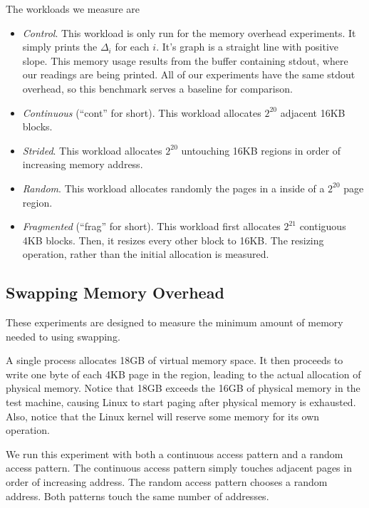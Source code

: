 \documentclass[twocolumn,11pt]{article}
\begin{document}
The workloads we measure are

\begin{itemize} \item \textit{Control}. This workload is only run for the memory
overhead experiments. It simply prints the $\Delta_i$ for each $i$. It's graph
is a straight line with positive slope. This memory usage results from the
buffer containing stdout, where our readings are being printed. All of our
experiments have the same stdout overhead, so this benchmark serves a baseline
for comparison.

\item \textit{Continuous} (``cont'' for short). This workload allocates $2^{20}$
adjacent 16KB blocks.

\item \textit{Strided}. This workload allocates $2^{20}$ untouching 16KB regions
in order of increasing memory address.

\item \textit{Random}. This workload allocates randomly the pages in a
inside of a $2^{20}$ page region.

\item \textit{Fragmented} (``frag'' for short). This workload first allocates
    $2^{21}$ contiguous 4KB blocks. Then, it resizes every other block to 16KB.
        The resizing operation, rather than the initial allocation is measured.
\end{itemize}

\subsection{Swapping Memory Overhead}
\label{swapping_memory_overhead}

These experiments are designed to measure the minimum amount of memory needed
to using swapping.

A single process allocates 18GB of virtual memory space. It then proceeds to
write one byte of each 4KB page in the region, leading to the actual allocation
of physical memory. Notice that 18GB exceeds the 16GB of physical memory in the
test machine, causing Linux to start paging after physical memory is exhausted.
Also, notice that the Linux kernel will reserve some memory for its own
operation.

We run this experiment with both a continuous access pattern and a random access
pattern. The continuous access pattern simply touches adjacent pages in order of
increasing address. The random access pattern chooses a random address. Both
patterns touch the same number of addresses.
\end{document}
